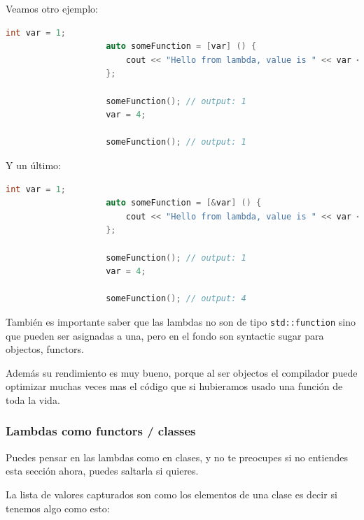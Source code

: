 \documentclass[12pt, fleqn]{report}                             %
\theoremstyle{break}                                            %
\newcommand{\textCode}[1]  { \texttt{#1} }                      %
\begin{document}
                Veamos otro ejemplo:
                \begin{lstlisting}[language=C++, gobble=20]
                    int var = 1;
                    auto someFunction = [var] () { 
                        cout << "Hello from lambda, value is " << var << '\n';
                    };

                    someFunction(); // output: 1
                    var = 4;

                    someFunction(); // output: 1
                \end{lstlisting}

                Y un último:
                \begin{lstlisting}[language=C++, gobble=20]
                    int var = 1;
                    auto someFunction = [&var] () { 
                        cout << "Hello from lambda, value is " << var << '\n';
                    };

                    someFunction(); // output: 1
                    var = 4;

                    someFunction(); // output: 4
                \end{lstlisting}

                También es importante saber que las lambdas no son de tipo \textCode{std::function}
                sino que pueden ser asignadas a una, pero en el fondo son syntactic sugar para objectos,
                functors.

                Además su rendimiento es muy bueno, porque al ser objectos el compilador puede optimizar
                muchas veces mas el código que si hubieramos usado una función de toda la vida.


                \subsubsection{Lambdas como functors / classes}
                
                    Puedes pensar en las lambdas como en clases, y no te preocupes si no entiendes
                    esta sección ahora, puedes saltarla si quieres.

                    La lista de valores capturados son como los elementos de una clase
                    es decir si tenemos algo como esto:
\end{document}
